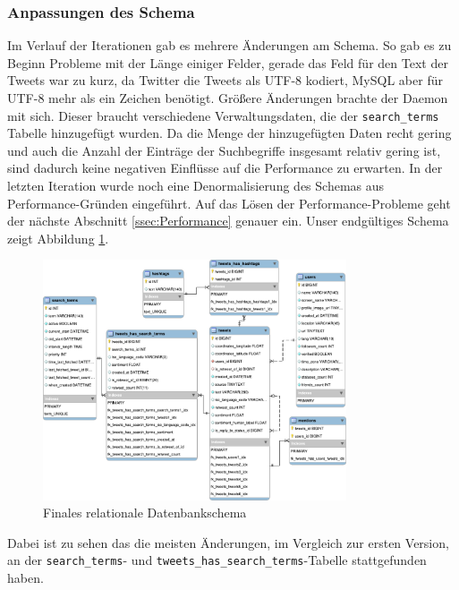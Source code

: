 \subsubsection{Anpassungen des Schema}
Im Verlauf der Iterationen gab es mehrere Änderungen am Schema.
So gab es zu Beginn Probleme mit der Länge einiger Felder, gerade das Feld für den Text der Tweets war zu kurz, da Twitter die Tweets als UTF-8 kodiert, MySQL aber für UTF-8 mehr als ein Zeichen benötigt.
Größere Änderungen brachte der Daemon mit sich. Dieser braucht verschiedene Verwaltungsdaten, die der \texttt{search\_terms} Tabelle hinzugefügt wurden.
Da die Menge der hinzugefügten Daten recht gering und auch die Anzahl der Einträge der Suchbegriffe insgesamt relativ gering ist, sind dadurch keine negativen Einflüsse auf die Performance zu erwarten.
In der letzten Iteration wurde noch eine Denormalisierung des Schemas aus Performance-Gründen eingeführt. 
Auf das Lösen der Performance-Probleme geht der nächste Abschnitt \ref{ssec:Performance} genauer ein.
Unser endgültiges Schema zeigt Abbildung \ref{img:schemadbfinal}.
\begin{figure}[ht]
\centering
\includegraphics[width=0.8\textwidth]{Bilder/Datenbank/SchemaLetzteIteration.pdf}
\caption{Finales relationale Datenbankschema}
\label{img:schemadbfinal}
\end{figure}
Dabei ist zu sehen das die meisten Änderungen, im Vergleich zur ersten Version, an der \texttt{search\_terms}- und \texttt{tweets\_has\_search\_terms}-Tabelle stattgefunden haben.


